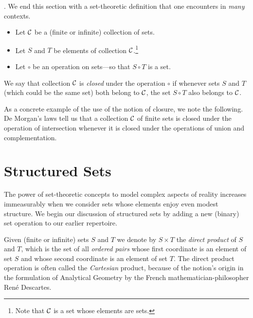 \bigskip

 
.
%
We end this section with a set-theoretic definition that one encounters in {\em many} contexts.
\begin{itemize}
\item
Let $\cal C$ be a (finite or infinite) collection of sets.
\medskip\item
Let $S$ and $T$ be elements of collection $\cal C$.\footnote{Note that $\cal C$ is a set whose elements are sets.}
\medskip\item
Let $\circ$ be an operation on sets---so that $S \circ T$ is a set.
\end{itemize}
We say that collection $\cal C$ is {\em closed} under the operation $\circ$ if whenever sets $S$ and $T$ (which could be the same set) both belong to $\cal C$, the set $S \circ T$ also belongs to $\cal C$.

\medskip

As a concrete example of the use of the notion of closure, we note the following.  De Morgan's laws tell us that a collection $\cal C$ of finite sets is closed under the operation of intersection whenever it is closed under the operations of union and complementation.

\section{Structured Sets}
\label{sec:structured-set}

The power of set-theoretic concepts to model complex aspects of reality increases immeasurably when we consider sets whose elements enjoy even modest structure.  We begin our discussion of structured sets by adding a new (binary) set operation to our earlier repertoire.

  

\smallskip

Given (finite or infinite) sets $S$ and $T$ we denote by $S \times T$ the {\it direct product} of $S$ and $T$, which is the set of all {\it ordered pairs} whose first coordinate is an element of set $S$ and whose second coordinate is an element of set $T$.  The direct product operation is often called the {\it Cartesian} product, because of the notion's origin in the formulation of Analytical Geometry by the French mathematician-philosopher Ren\'{e} Descartes. 

